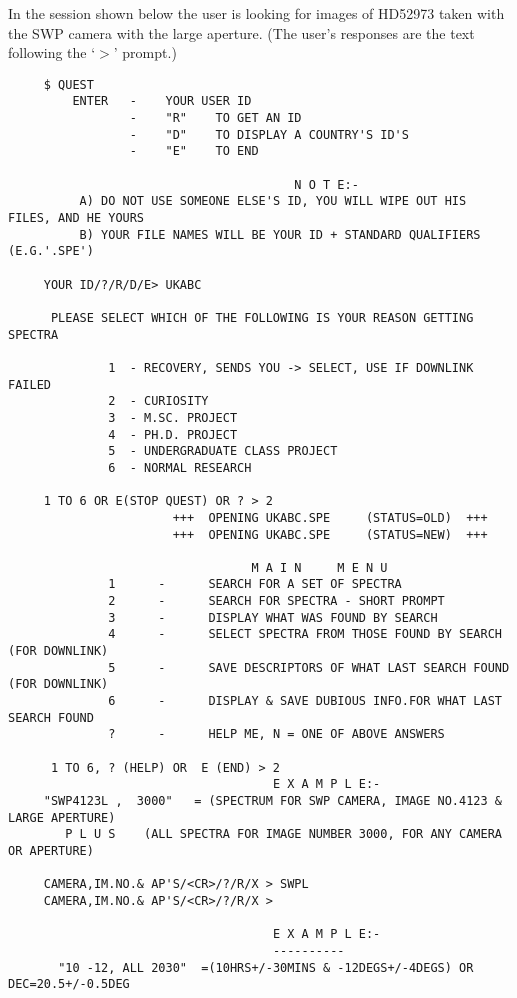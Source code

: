 In the session shown below the user is looking for images of HD52973 taken
with the SWP camera with the large aperture. (The user's responses are the
text following the `$>$' prompt.)
\begin{footnotesize}
\begin{verbatim}
     $ QUEST
         ENTER   -    YOUR USER ID
                 -    "R"    TO GET AN ID
                 -    "D"    TO DISPLAY A COUNTRY'S ID'S
                 -    "E"    TO END

                                        N O T E:-
          A) DO NOT USE SOMEONE ELSE'S ID, YOU WILL WIPE OUT HIS FILES, AND HE YOURS
          B) YOUR FILE NAMES WILL BE YOUR ID + STANDARD QUALIFIERS (E.G.'.SPE')

     YOUR ID/?/R/D/E> UKABC

      PLEASE SELECT WHICH OF THE FOLLOWING IS YOUR REASON GETTING SPECTRA

              1  - RECOVERY, SENDS YOU -> SELECT, USE IF DOWNLINK FAILED
              2  - CURIOSITY
              3  - M.SC. PROJECT
              4  - PH.D. PROJECT
              5  - UNDERGRADUATE CLASS PROJECT
              6  - NORMAL RESEARCH

     1 TO 6 OR E(STOP QUEST) OR ? > 2
                       +++  OPENING UKABC.SPE     (STATUS=OLD)  +++
                       +++  OPENING UKABC.SPE     (STATUS=NEW)  +++

                                  M A I N     M E N U
              1      -      SEARCH FOR A SET OF SPECTRA
              2      -      SEARCH FOR SPECTRA - SHORT PROMPT
              3      -      DISPLAY WHAT WAS FOUND BY SEARCH
              4      -      SELECT SPECTRA FROM THOSE FOUND BY SEARCH (FOR DOWNLINK)
              5      -      SAVE DESCRIPTORS OF WHAT LAST SEARCH FOUND (FOR DOWNLINK)
              6      -      DISPLAY & SAVE DUBIOUS INFO.FOR WHAT LAST SEARCH FOUND
              ?      -      HELP ME, N = ONE OF ABOVE ANSWERS

      1 TO 6, ? (HELP) OR  E (END) > 2
                                     E X A M P L E:-
     "SWP4123L ,  3000"   = (SPECTRUM FOR SWP CAMERA, IMAGE NO.4123 & LARGE APERTURE)
        P L U S    (ALL SPECTRA FOR IMAGE NUMBER 3000, FOR ANY CAMERA OR APERTURE)

     CAMERA,IM.NO.& AP'S/<CR>/?/R/X > SWPL
     CAMERA,IM.NO.& AP'S/<CR>/?/R/X >

                                     E X A M P L E:-
                                     ----------
       "10 -12, ALL 2030"  =(10HRS+/-30MINS & -12DEGS+/-4DEGS) OR DEC=20.5+/-0.5DEG


\end{verbatim}
\end{footnotesize}
